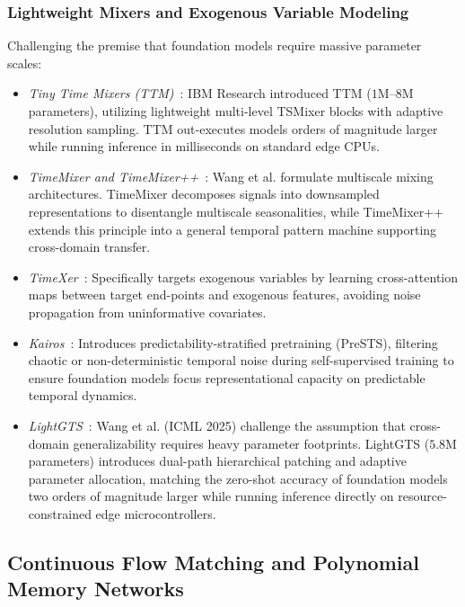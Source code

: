 \subsubsection{Lightweight Mixers and Exogenous Variable Modeling}
Challenging the premise that foundation models require massive parameter scales:
\begin{itemize}[leftmargin=*]
    \item \emph{Tiny Time Mixers (TTM)}~\cite{ekambaram2024ttm}: IBM Research introduced TTM ($1\text{M}$--$8\text{M}$ parameters), utilizing lightweight multi-level TSMixer blocks with adaptive resolution sampling. TTM out-executes models orders of magnitude larger while running inference in milliseconds on standard edge CPUs.
    \item \emph{TimeMixer and TimeMixer++}~\cite{wang2024timemixer,wang2024timemixerplus}: Wang et al. formulate multiscale mixing architectures. TimeMixer decomposes signals into downsampled representations to disentangle multiscale seasonalities, while TimeMixer++ extends this principle into a general temporal pattern machine supporting cross-domain transfer.
    \item \emph{TimeXer}~\cite{wang2024timexer}: Specifically targets exogenous variables by learning cross-attention maps between target end-points and exogenous features, avoiding noise propagation from uninformative covariates.
    \item \emph{Kairos}~\cite{zhang2025kairos}: Introduces predictability-stratified pretraining (PreSTS), filtering chaotic or non-deterministic temporal noise during self-supervised training to ensure foundation models focus representational capacity on predictable temporal dynamics.
    \item \emph{LightGTS}~\cite{wang2025lightgts}: Wang et al. (ICML 2025) challenge the assumption that cross-domain generalizability requires heavy parameter footprints. LightGTS ($5.8\text{M}$ parameters) introduces dual-path hierarchical patching and adaptive parameter allocation, matching the zero-shot accuracy of foundation models two orders of magnitude larger while running inference directly on resource-constrained edge microcontrollers.
\end{itemize}

\subsection{Continuous Flow Matching and Polynomial Memory Networks}

